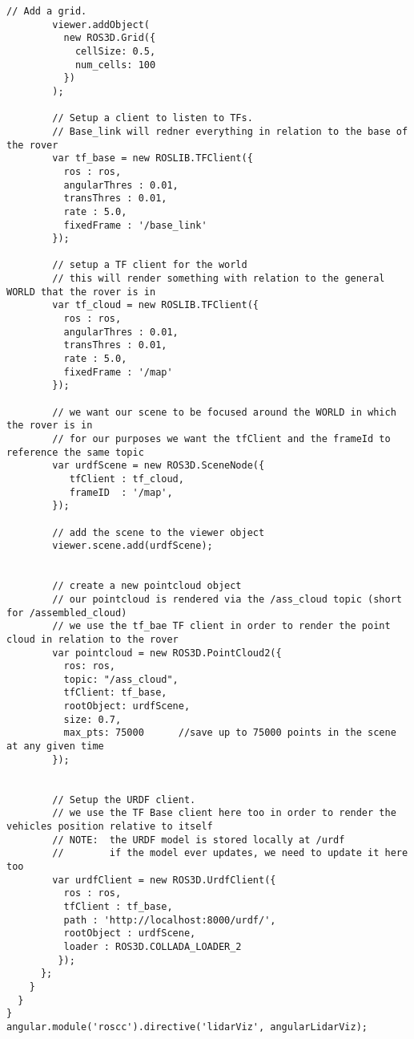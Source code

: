 \begin{lstlisting}[breaklines=true,basicstyle=\tiny]
        // Add a grid.
        viewer.addObject(
          new ROS3D.Grid({
            cellSize: 0.5,
            num_cells: 100
          })
        );

        // Setup a client to listen to TFs.
        // Base_link will redner everything in relation to the base of the rover
        var tf_base = new ROSLIB.TFClient({
          ros : ros,
          angularThres : 0.01,
          transThres : 0.01,
          rate : 5.0,
          fixedFrame : '/base_link'
        });

        // setup a TF client for the world
        // this will render something with relation to the general WORLD that the rover is in
        var tf_cloud = new ROSLIB.TFClient({
          ros : ros,
          angularThres : 0.01,
          transThres : 0.01,
          rate : 5.0,
          fixedFrame : '/map'
        });

        // we want our scene to be focused around the WORLD in which the rover is in
        // for our purposes we want the tfClient and the frameId to reference the same topic
        var urdfScene = new ROS3D.SceneNode({
           tfClient : tf_cloud,
           frameID  : '/map',
        });

        // add the scene to the viewer object
        viewer.scene.add(urdfScene);


        // create a new pointcloud object
        // our pointcloud is rendered via the /ass_cloud topic (short for /assembled_cloud)
        // we use the tf_bae TF client in order to render the point cloud in relation to the rover
        var pointcloud = new ROS3D.PointCloud2({
          ros: ros,
          topic: "/ass_cloud",
          tfClient: tf_base,
          rootObject: urdfScene,
          size: 0.7,
          max_pts: 75000      //save up to 75000 points in the scene at any given time
        });


        // Setup the URDF client.
        // we use the TF Base client here too in order to render the vehicles position relative to itself
        // NOTE:  the URDF model is stored locally at /urdf
        //        if the model ever updates, we need to update it here too
        var urdfClient = new ROS3D.UrdfClient({
          ros : ros,
          tfClient : tf_base,
          path : 'http://localhost:8000/urdf/',
          rootObject : urdfScene,
          loader : ROS3D.COLLADA_LOADER_2
         });
      };
    }
  }
}
angular.module('roscc').directive('lidarViz', angularLidarViz);
\end{lstlisting}




